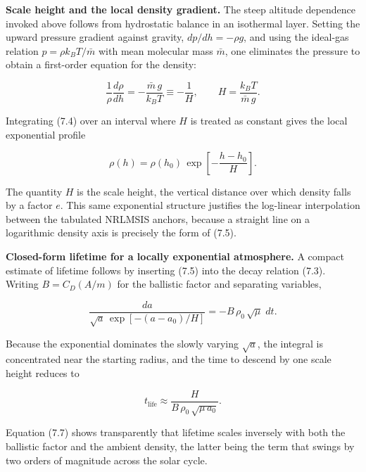 \documentclass[
  11pt,
  openany,
  oneside]{book}
\begin{document}
\textbf{Scale height and the local density gradient.} The steep altitude
dependence invoked above follows from hydrostatic balance in an
isothermal layer. Setting the upward pressure gradient against gravity,
\(dp/dh = -\rho g\), and using the ideal-gas relation
\(p = \rho k_B T / \bar m\) with mean molecular mass \(\bar m\), one
eliminates the pressure to obtain a first-order equation for the
density:

\begin{equation}
\frac{1}{\rho}\frac{d\rho}{dh} = -\frac{\bar m\, g}{k_B T} \equiv -\frac{1}{H}, \qquad H = \frac{k_B T}{\bar m\, g}. \tag{7.4}
\end{equation}

Integrating (7.4) over an interval where \(H\) is treated as constant
gives the local exponential profile

\begin{equation}
\rho(h) = \rho(h_0)\,\exp\!\left[-\frac{h - h_0}{H}\right]. \tag{7.5}
\end{equation}

The quantity \(H\) is the scale height, the vertical distance over which
density falls by a factor \(e\). This same exponential structure
justifies the log-linear interpolation between the tabulated NRLMSIS
anchors, because a straight line on a logarithmic density axis is
precisely the form of (7.5).

\textbf{Closed-form lifetime for a locally exponential atmosphere.} A
compact estimate of lifetime follows by inserting (7.5) into the decay
relation (7.3). Writing \(B = C_D (A/m)\) for the ballistic factor and
separating variables,

\begin{equation}
\frac{da}{\sqrt{a}\,\exp[-(a - a_0)/H]} = -B\,\rho_0\,\sqrt{\mu}\; dt. \tag{7.6}
\end{equation}

Because the exponential dominates the slowly varying \(\sqrt{a}\), the
integral is concentrated near the starting radius, and the time to
descend by one scale height reduces to

\begin{equation}
t_{\mathrm{life}} \approx \frac{H}{B\,\rho_0\,\sqrt{\mu\, a_0}}. \tag{7.7}
\end{equation}

Equation (7.7) shows transparently that lifetime scales inversely with
both the ballistic factor and the ambient density, the latter being the
term that swings by two orders of magnitude across the solar cycle.
\end{document}
